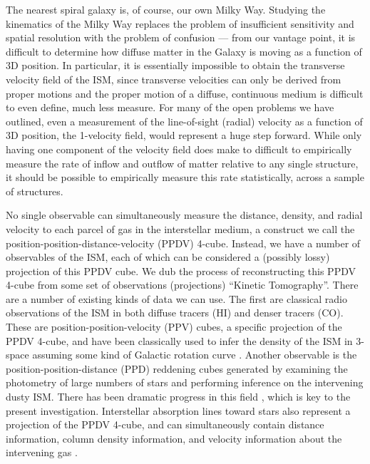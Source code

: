 The nearest spiral galaxy is, of course, our own Milky Way. 
Studying the kinematics of the Milky Way replaces the problem of insufficient sensitivity and spatial resolution with the problem of confusion --- from our vantage point, it is difficult to determine how diffuse matter in the Galaxy is moving as a function of 3D position.
In particular, it is essentially impossible to obtain the transverse velocity field of the ISM, since transverse velocities can only be derived from proper motions and the proper motion of a diffuse, continuous medium is difficult to even define, much less measure. 
For many of the open problems we have outlined, even a measurement of the line-of-sight (radial) velocity as a function of 3D position, the 1-velocity field, would represent a huge step forward. 
While only having one component of the velocity field does make to difficult to empirically measure the  rate of inflow and outflow of matter relative to any single structure, it should be possible to empirically measure this rate statistically, across a sample of structures. 

No single observable can simultaneously measure the distance, density, and radial velocity to each parcel of gas in the interstellar medium, a construct we call the position-position-distance-velocity (PPDV) 4-cube. Instead, we have a number of observables of the ISM, each of which can be considered a (possibly lossy) projection of this PPDV cube. We dub the process of reconstructing this PPDV 4-cube from some set of observations (projections) ``Kinetic Tomography''. There are a number of existing kinds of data we can use. The first are classical radio observations of the ISM in both diffuse tracers (HI) and denser tracers (CO). These are position-position-velocity (PPV) cubes, a specific projection of the PPDV 4-cube, and have been classically used to infer the density of the ISM in 3-space assuming some kind of Galactic rotation curve \citep[e.g.][]{Levine_2006}. Another observable is the position-position-distance (PPD) reddening cubes generated by examining the photometry of large numbers of stars and performing inference on the intervening dusty ISM. There has been dramatic progress in this field \cite{Marshall_2006,Lallement_2014,Green_2015}, which is key to the present investigation. Interstellar absorption lines toward stars also represent a projection of the PPDV 4-cube, and can simultaneously contain distance information, column density information, and velocity information about the intervening gas \cite{Welsh10,Zasowski_2014,2015MmSAI..86..521Z}.

